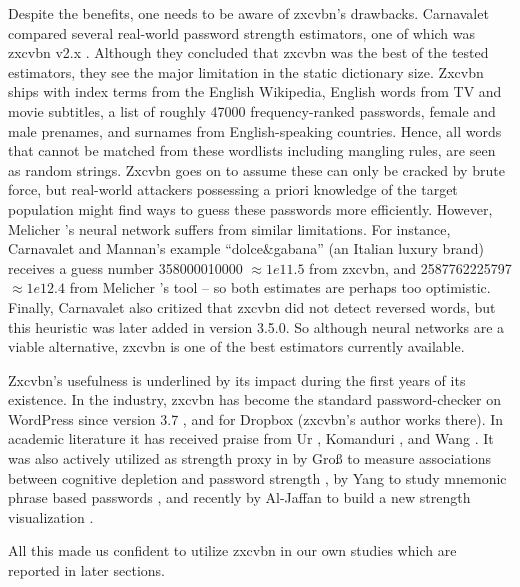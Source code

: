 	Despite the benefits, one needs to be aware of zxcvbn's drawbacks. Carnavalet compared several real-world password strength estimators, one of which was zxcvbn v2.x \cite{DeCarnedeCarnavalet2015PasswordMeters}. Although they concluded that zxcvbn was the best of the tested estimators, they see the major limitation in the static dictionary size. Zxcvbn ships with index terms from the English Wikipedia, English words from TV and movie subtitles, a list of roughly 47000 frequency-ranked passwords, female and male prenames, and surnames from English-speaking countries. Hence, all words that cannot be matched from these wordlists including mangling rules, are seen as random strings. Zxcvbn goes on to assume these can only be cracked by brute force, but real-world attackers possessing a priori knowledge of the target population might find ways to guess these passwords more efficiently. However, Melicher \etal's neural network suffers from similar limitations. For instance, Carnavalet and Mannan's \cite{Carnavalet2014AnalyzingPWStrengthMeters} example ``dolce\&gabana'' (an Italian luxury brand) receives a guess number 358000010000 $\approx 1e11.5$ from zxcvbn, and 2587762225797 $\approx 1e12.4$ from Melicher \etal's tool -- so both estimates are perhaps too optimistic. Finally, Carnavalet also critized that zxcvbn did not detect reversed words, but this heuristic was later added in version 3.5.0. So although neural networks are a viable alternative, zxcvbn is one of the best estimators currently available. 
	
	Zxcvbn's usefulness is underlined by its impact during the first years of its existence. In the industry, zxcvbn has become the standard password-checker on WordPress since version 3.7 \cite{DeCarnedeCarnavalet2015PasswordMeters}, and for Dropbox (zxcvbn's author works there). In academic literature it has received praise from Ur \etal \cite{Ur2017DataDrivenPWMeter}, Komanduri \etal \cite{Komanduri2014Telepathwords}, and Wang \etal \cite{Wang2016fuzzyPWM}. It was also actively utilized as strength proxy in by Groß \etal to measure associations between cognitive depletion and password strength \cite{Gross2016CognitiveDepletion}, by Yang \etal to study mnemonic phrase based passwords \cite{Yang2016MnemonicSentenceBased}, and recently by Al-Jaffan to build a new strength visualization \cite{Aljaffan2017PasswordSecurityVisualizer}.
	
	All this made us confident to utilize zxcvbn in our own studies which are reported in later sections. 
	
